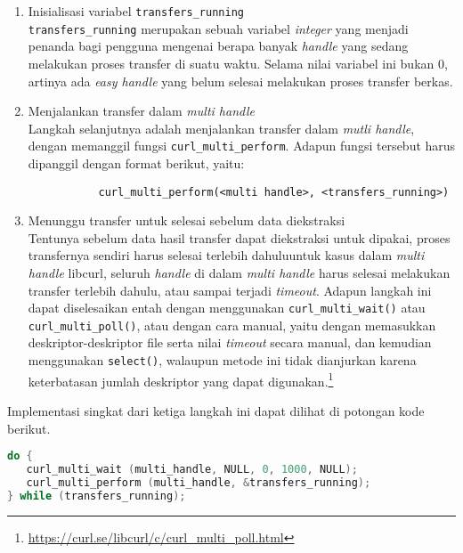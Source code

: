 \begin{enumerate}
	\item Inisialisasi variabel \verb|transfers_running|\\
	\verb|transfers_running| merupakan sebuah variabel \textit{integer} yang menjadi penanda bagi pengguna mengenai berapa banyak \textit{handle} yang sedang melakukan proses transfer di suatu waktu. Selama nilai variabel ini bukan 0, artinya ada \textit{easy handle} yang belum selesai melakukan proses transfer berkas.
	\item Menjalankan transfer dalam \textit{multi handle}\\
	Langkah selanjutnya adalah menjalankan transfer dalam \textit{mutli handle}, dengan memanggil fungsi \verb|curl_multi_perform|. Adapun fungsi tersebut harus dipanggil dengan format berikut, yaitu:

\begin{verbatim}
           curl_multi_perform(<multi handle>, <transfers_running>)
\end{verbatim}

	\item Menunggu transfer untuk selesai sebelum data diekstraksi\\
	Tentunya sebelum data hasil transfer dapat diekstraksi untuk dipakai, proses transfernya sendiri harus selesai terlebih dahulu\textemdash untuk kasus dalam \textit{multi handle} libcurl, seluruh \textit{handle} di dalam \textit{multi handle} harus selesai melakukan transfer terlebih dahulu, atau sampai terjadi \textit{timeout}. Adapun langkah ini dapat diselesaikan entah dengan menggunakan \verb|curl_multi_wait()| atau \verb|curl_multi_poll()|, atau dengan cara manual, yaitu dengan memasukkan deskriptor-deskriptor file serta nilai \textit{timeout} secara manual, dan kemudian menggunakan \verb|select()|, walaupun metode ini tidak dianjurkan karena keterbatasan jumlah deskriptor yang dapat digunakan.\footnote{\href{https://curl.se/libcurl/c/curl\_multi\_poll.html}{https://curl.se/libcurl/c/curl\_multi\_poll.html}}
\end{enumerate}
\noindent
Implementasi singkat dari ketiga langkah ini dapat dilihat di potongan kode berikut.

\begin{lstlisting}[language=C, caption=Loop sederhana dari pengunaan \textit{multi handle} curl, label=code:curl-usage-multi]
do {
   curl_multi_wait (multi_handle, NULL, 0, 1000, NULL);
   curl_multi_perform (multi_handle, &transfers_running);
} while (transfers_running);
\end{lstlisting}

